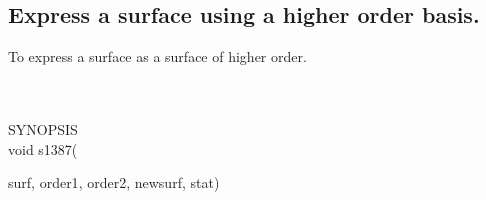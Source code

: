 \subsection{Express a surface using a higher order basis.}
\begin{minipg1}
  To express a surface as a surface of higher order.
\end{minipg1} \\ \\
SYNOPSIS\\
        \>void s1387(\begin{minipg3}
                                {\fov surf}, {\fov order1}, {\fov order2}, {\fov newsurf}, {\fov stat})
                \end{minipg3}\\[0.3ex]

